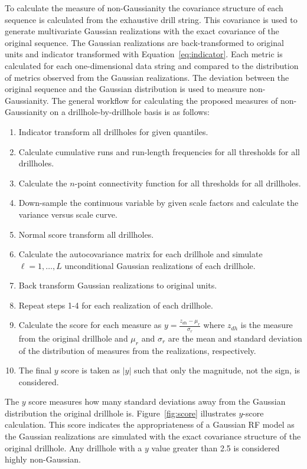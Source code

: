 To calculate the measure of non-Gaussianity the covariance structure of each sequence is calculated from the exhaustive drill string. This covariance is used to generate multivariate Gaussian realizations with the exact covariance of the original sequence. The Gaussian realizations are back-transformed to original units and indicator transformed with Equation~\ref{eq:indicator}. Each metric is calculated for each one-dimensional data string and compared to the distribution of metrics observed from the Gaussian realizations. The deviation between the original sequence and the Gaussian distribution is used to measure non-Gaussianity. The general workflow for calculating the proposed measures of non-Gaussianity on a drillhole-by-drillhole basis is as follows:
\begin{enumerate}[noitemsep]
    \item Indicator transform all drillholes for given quantiles.
    \item Calculate cumulative runs and run-length frequencies for all thresholds for all drillholes.
    \item Calculate the $n$-point connectivity function for all thresholds for all drillholes.
    \item Down-sample the continuous variable by given scale factors and calculate the variance versus scale curve.
    \item Normal score transform all drillholes.
    \item Calculate the autocovariance matrix for each drillhole and simulate $\ell=1,\dots,L$ unconditional Gaussian realizations of each drillhole.
    \item Back transform Gaussian realizations to original units.
    \item Repeat steps 1-4 for each realization of each drillhole.
    \item Calculate the score for each measure as $y = \frac{z_{dh}-\mu_{r}}{\sigma_{r}}$ where $z_{dh}$ is the measure from the original drillhole and $\mu_{r}$ and $\sigma_{r}$ are the mean and standard deviation of the distribution of measures from the realizations, respectively.
    \item The final $y$ score is taken as $\lvert y \rvert$ such that only the magnitude, not the sign, is considered.
\end{enumerate}

The $y$ score measures how many standard deviations away from the Gaussian distribution the original drillhole is. Figure~\ref{fig:score} illustrates $y$-score calculation. This score indicates the appropriateness of a Gaussian \gls{RF} model as the Gaussian realizations are simulated with the exact covariance structure of the original drillhole. Any drillhole with a $y$ value greater than 2.5 is considered highly non-Gaussian.


